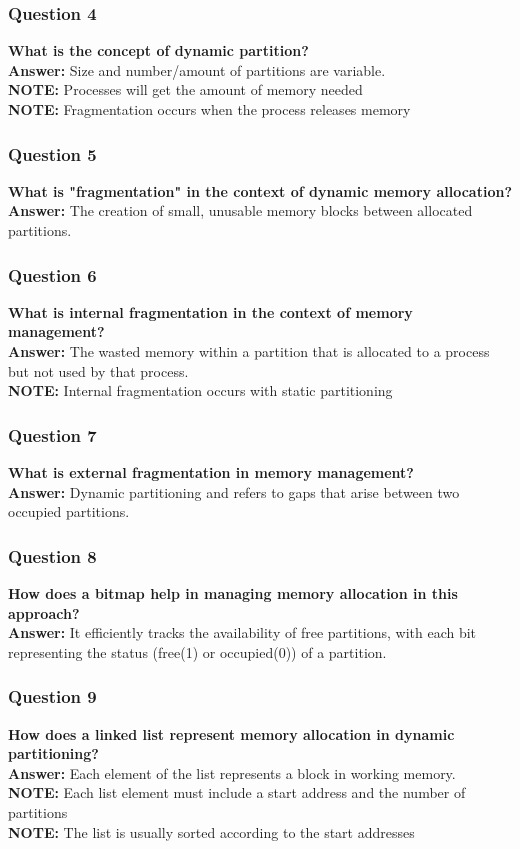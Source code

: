\documentclass{article}
\begin{document}
\subsubsection*{Question 4}
\textbf{What is the concept of dynamic partition?} \\
\textbf{Answer:} Size and number/amount of partitions are variable. \\
\textbf{NOTE:} Processes will get the amount of memory needed \\
\textbf{NOTE:} Fragmentation occurs when the process releases memory

\subsubsection*{Question 5}
\textbf{What is "fragmentation" in the context of dynamic memory allocation?} \\
\textbf{Answer:} The creation of small, unusable memory blocks between allocated partitions.

\subsubsection*{Question 6}
\textbf{What is internal fragmentation in the context of memory management?} \\
\textbf{Answer:} The wasted memory within a partition that is allocated to a process but not used by that process. \\
\textbf{NOTE:} Internal fragmentation occurs with static partitioning

\subsubsection*{Question 7}
\textbf{What is external fragmentation in memory management?} \\
\textbf{Answer:} Dynamic partitioning and refers to gaps that arise between two occupied partitions.

\subsubsection*{Question 8}
\textbf{How does a bitmap help in managing memory allocation in this approach?} \\
\textbf{Answer:} It efficiently tracks the availability of free partitions, with each bit representing the status (free(1) or occupied(0)) of a partition.

\subsubsection*{Question 9}
\textbf{How does a linked list represent memory allocation in dynamic partitioning?} \\
\textbf{Answer:} Each element of the list represents a block in working memory. \\
\textbf{NOTE:} Each list element must include a start address and the number of partitions \\
\textbf{NOTE:} The list is usually sorted according to the start addresses
\end{document}
